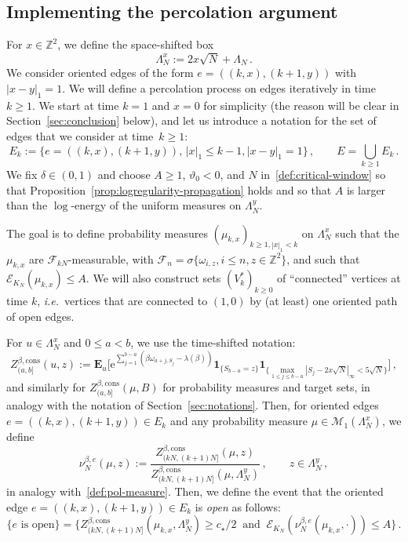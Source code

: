 \documentclass[11pt]{amsart}
\numberwithin{equation}{section}
\newcommand*{\bE}{\mathbf{E}}
\newcommand*{\ind}{\mathbf{1}}
\newcommand*{\numberset}{\mathbb}
\newcommand*{\Z}{\numberset{Z}}
\newcommand{\e}{\mathrm{e}}
\newcommand*{\cons}{\mathrm{cons}}
\theoremstyle{plain}
\theoremstyle{definition}
\theoremstyle{remark}
\newcommand{\blue}{\color{blue}}
\begin{document}
\subsection{Implementing the percolation argument}
\label{sec:perco}


For $x\in\mathbb Z^2$, we define the space-shifted box
$$
\Lambda_N^{x}:=2x\sqrt N+\Lambda_N \,.
$$
We consider oriented edges of the form \(e = ((k,x),(k+1,y))\) with \(|x-y|_1=1\).
We will define a percolation process on edges iteratively in time \(k\geq 1\).
We start at time \(k=1\) and \(x=0\) for simplicity (the reason will be clear in Section~\ref{sec:conclusion} below), and let us introduce a notation for the set of edges that we consider at time~\(k\geq 1\):
\[
E_k := \big\{ e= ((k,x),(k+1,y)), \, |x|_1\leq k-1, |x-y|_1 =1\big\} \,,\qquad E =\bigcup_{k\geq 1} E_k \,.
\]
We fix \(\delta\in (0,1)\) and choose \(A \geq 1\), \(\vartheta_0<0\), and \(N\) in~\eqref{def:critical-window} so that Proposition~\ref{prop:logregularity-propagation} holds  and so that \(A\) is larger than the \(\log\)-energy of the uniform measures on \(\Lambda_N^y\).

The goal is to define probability measures \((\mu_{k,x})_{k\geq 1, |x|_1< k}\) on \(\Lambda_N^x\) such that the \(\mu_{k,x}\) are \(\mathcal{F}_{kN}\)-measurable, with \(\mathcal{F}_n = \sigma\{ \omega_{i,z}, i\leq n, z \in \Z^2\}\), and such that \(\mathcal{E}_{K_N}(\mu_{k,x}) \leq A\).
We will also construct sets \((V_k^*)_{k\geq 0}\) of ``connected'' vertices at time \(k\), \textit{i.e.}\ vertices that are connected to \((1,0)\) by (at least) one oriented path of open edges.


For \(u\in \Lambda_N^x\) and \(0\le a<b\), we use the time-shifted notation:
\[
Z_{(a,b]}^{\beta,\cons}(u,z)
:= \bE_u\Big[ \e^{\sum_{j=1}^{b-a}(\beta\omega_{a+j,S_j}-\lambda(\beta))} \ind_{\{S_{b-a}=z\}} \ind_{\{ \max_{1\leq j \leq b-a} |S_j - 2x \sqrt{N} |_\infty < 5 \sqrt{N}\}} \Big] \,,
\]
and similarly for \(Z_{(a,b]}^{\beta,\cons}(\mu,B)\) for probability measures and target sets, in analogy with the notation of Section~\ref{sec:notations}.
Then, for oriented edges \(e=((k,x),(k+1,y)) \in E_k\) and any probability measure \(\mu \in \mathcal{M}_1(\Lambda_N^x)\), we define 
\[
\nu_{N}^{\beta,e}(\mu,z)
:=\frac{Z_{(kN,(k+1)N]}^{\beta,\cons}(\mu,z)}{Z_{(kN,(k+1)N]}^{\beta,\cons}(\mu,\Lambda_N^y)} \, ,
\qquad z\in\Lambda_N^y \,,
\]
in analogy with~\eqref{def:pol-measure}.
Then, we define the event that the oriented edge \(e=((k,x),(k+1,y)) \in E_k\) is \emph{open} as follows: 
\begin{equation}
       \label{def:open}
       \{e \text{ is open}\} = \Big\{
       Z_{(kN,(k+1)N]}^{\beta,\cons}(\mu_{k,x},\Lambda_N^{y})\geq c_\star/2
       \ \text{ and }\ 
       \mathcal{E}_{K_N}(\nu_N^{\beta,e}(\mu_{k,x},\cdot)) \leq A \Big\} \,.  
\end{equation}
\end{document}
